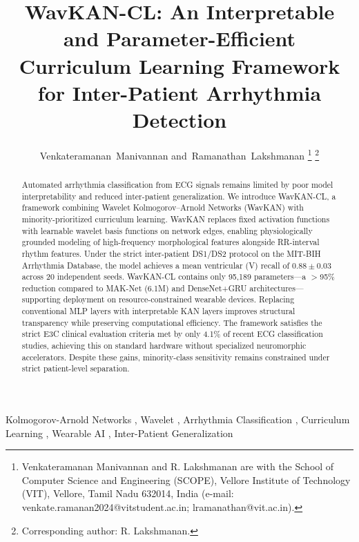 \documentclass[journal]{IEEEtran}
\begin{document}
\title{WavKAN-CL: An Interpretable and Parameter-Efficient Curriculum Learning Framework for Inter-Patient Arrhythmia Detection}

\author{Venkateramanan~Manivannan
        and~Ramanathan~Lakshmanan%
\thanks{Venkateramanan Manivannan and R. Lakshmanan are with the School of Computer Science and Engineering (SCOPE), Vellore Institute of Technology (VIT), Vellore, Tamil Nadu 632014, India (e-mail: venkate.ramanan2024@vitstudent.ac.in; lramanathan@vit.ac.in).}%
\thanks{Corresponding author: R. Lakshmanan.}}


\maketitle

\begin{abstract}
Automated arrhythmia classification from ECG signals remains limited by poor model interpretability and reduced inter-patient generalization. We introduce WavKAN-CL, a framework combining Wavelet Kolmogorov--Arnold Networks (WavKAN) with minority-prioritized curriculum learning. WavKAN replaces fixed activation functions with learnable wavelet basis functions on network edges, enabling physiologically grounded modeling of high-frequency morphological features alongside RR-interval rhythm features. Under the strict inter-patient DS1/DS2 protocol on the MIT-BIH Arrhythmia Database, the model achieves a mean ventricular (V) recall of $0.88 \pm 0.03$ across 20 independent seeds. WavKAN-CL contains only 95,189 parameters---a $>$95\% reduction compared to MAK-Net (6.1M) and DenseNet+GRU architectures---supporting deployment on resource-constrained wearable devices. Replacing conventional MLP layers with interpretable KAN layers improves structural transparency while preserving computational efficiency. The framework satisfies the strict E3C clinical evaluation criteria met by only 4.1\% of recent ECG classification studies, achieving this on standard hardware without specialized neuromorphic accelerators. Despite these gains, minority-class sensitivity remains constrained under strict patient-level separation.
\end{abstract}

\begin{IEEEkeywords}
Kolmogorov-Arnold Networks , Wavelet , Arrhythmia Classification , Curriculum Learning , Wearable AI , Inter-Patient Generalization
\end{IEEEkeywords}
\end{document}
